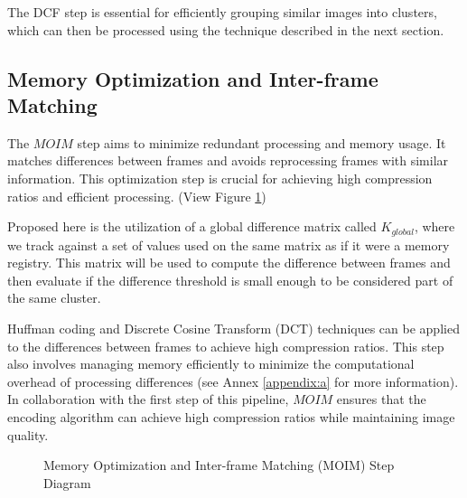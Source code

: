 \documentclass[twocolumn]{article}
\begin{document}
The DCF step is essential for efficiently grouping similar images into clusters, which can then be processed using the technique described in the next section.

\subsection{Memory Optimization and Inter-frame Matching}
The $MOIM$ step aims to minimize redundant processing and memory usage. It matches differences between frames and avoids reprocessing frames with similar information. This optimization step is crucial for achieving high compression ratios and efficient processing. (View Figure \ref{fig:figure2})

Proposed here is the utilization of a global difference matrix called $K_{global}$, where we track against a set of values used on the same matrix as if it were a memory registry. This matrix will be used to compute the difference between frames and then evaluate if the difference threshold is small enough to be considered part of the same cluster.

Huffman coding and Discrete Cosine Transform (DCT) techniques can be applied to the differences between frames to achieve high compression ratios. This step also involves managing memory efficiently to minimize the computational overhead of processing differences (see Annex \ref{appendix:a} for more information). In collaboration with the first step of this pipeline, $MOIM$ ensures that the encoding algorithm can achieve high compression ratios while maintaining image quality.

\begin{figure}[!hb]
    \centering
    \caption{Memory Optimization and Inter-frame Matching (MOIM) Step Diagram}
    \label{fig:figure2}
\end{figure}
\end{document}
